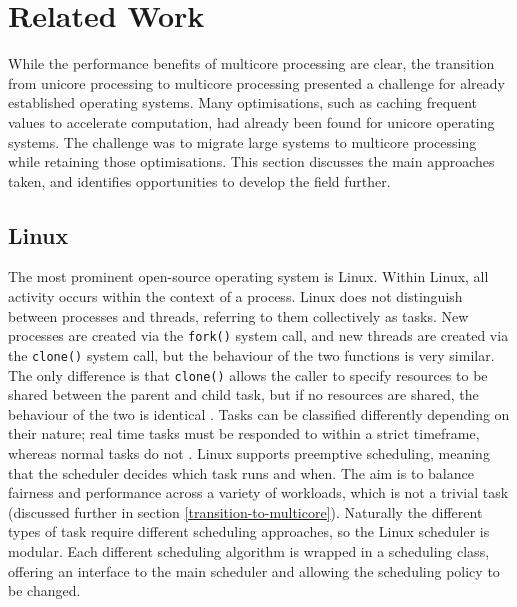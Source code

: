 \documentclass[bsc,frontabs,singlespacing,parskip,deptreport]{infthesis}
\begin{document}



\section{Related Work} \label{related-work}
While the performance benefits of multicore processing are clear, the transition from unicore processing to multicore processing presented a challenge for already established operating systems. Many optimisations, such as caching frequent values to accelerate computation, had already been found for unicore operating systems. The challenge was to migrate large systems to multicore processing while retaining those optimisations. This section discusses the main approaches taken, and identifies opportunities to develop the field further.

\subsection{Linux}
The most prominent open-source operating system is Linux. Within Linux, all activity occurs within the context of a process. Linux does not distinguish between processes and threads, referring to them collectively as tasks. New processes are created via the \verb|fork()| system call, and new threads are created via the \verb|clone()| system call, but the behaviour of the two functions is very similar. The only difference is that \verb|clone()| allows the caller to specify resources to be shared between the parent and child task, but if no resources are shared, the behaviour of the two is identical \cite{silberschatz}. Tasks can be classified differently depending on their nature; real time tasks must be responded to within a strict timeframe, whereas normal tasks do not \cite{seeker}. Linux supports preemptive scheduling, meaning that the scheduler decides which task runs and when. The aim is to balance fairness and performance across a variety of workloads, which is not a trivial task (discussed further in section \ref{transition-to-multicore}). Naturally the different types of task require different scheduling approaches, so the Linux scheduler is modular. Each different scheduling algorithm is wrapped in a scheduling class, offering an interface to the main scheduler \cite{seeker} and allowing the scheduling policy to be changed. 
\end{document}
